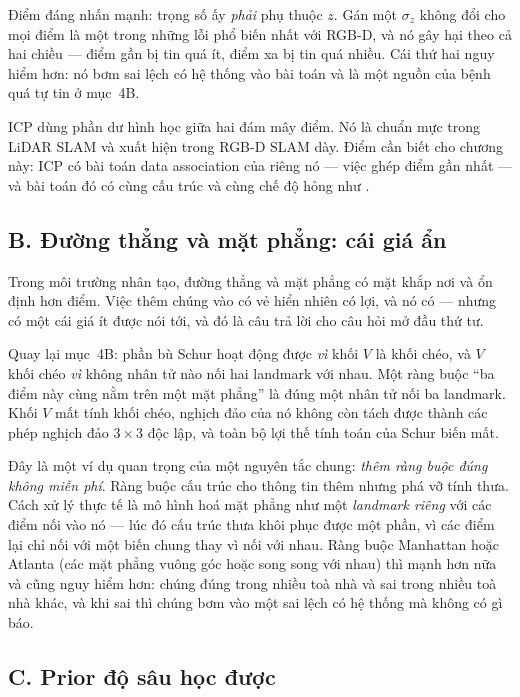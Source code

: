 \documentclass[../../vslam.tex]{subfiles}
\begin{document}
Điểm đáng nhấn mạnh: trọng số ấy \emph{phải} phụ thuộc \(z\). Gán một \(\sigma_z\) không đổi cho mọi điểm là một trong những lỗi phổ biến nhất với RGB-D, và nó gây hại theo cả hai chiều --- điểm gần bị tin quá ít, điểm xa bị tin quá nhiều. Cái thứ hai nguy hiểm hơn: nó bơm sai lệch có hệ thống vào bài toán và là một nguồn của bệnh quá tự tin ở  mục~4B.

ICP dùng phần dư hình học giữa hai đám mây điểm. Nó là chuẩn mực trong LiDAR SLAM và xuất hiện trong RGB-D SLAM dày. Điểm cần biết cho chương này: ICP có bài toán data association của riêng nó --- việc ghép điểm gần nhất --- và bài toán đó có cùng cấu trúc và cùng chế độ hỏng như .

\subsection{B. Đường thẳng và mặt phẳng: cái giá ẩn}

Trong môi trường nhân tạo, đường thẳng và mặt phẳng có mặt khắp nơi và ổn định hơn điểm. Việc thêm chúng vào có vẻ hiển nhiên có lợi, và nó có --- nhưng có một cái giá ít được nói tới, và đó là câu trả lời cho câu hỏi mở đầu thứ tư.

Quay lại  mục~4B: phần bù Schur hoạt động được \emph{vì} khối \(V\) là khối chéo, và \(V\) khối chéo \emph{vì} không nhân tử nào nối hai landmark với nhau. Một ràng buộc ``ba điểm này cùng nằm trên một mặt phẳng'' là đúng một nhân tử nối ba landmark. Khối \(V\) mất tính khối chéo, nghịch đảo của nó không còn tách được thành các phép nghịch đảo \(3\times3\) độc lập, và toàn bộ lợi thế tính toán của Schur biến mất.

Đây là một ví dụ quan trọng của một nguyên tắc chung: \emph{thêm ràng buộc đúng không miễn phí}. Ràng buộc cấu trúc cho thông tin thêm nhưng phá vỡ tính thưa. Cách xử lý thực tế là mô hình hoá mặt phẳng như một \emph{landmark riêng} với các điểm nối vào nó --- lúc đó cấu trúc thưa khôi phục được một phần, vì các điểm lại chỉ nối với một biến chung thay vì nối với nhau. Ràng buộc Manhattan hoặc Atlanta (các mặt phẳng vuông góc hoặc song song với nhau) thì mạnh hơn nữa và cũng nguy hiểm hơn: chúng đúng trong nhiều toà nhà và sai trong nhiều toà nhà khác, và khi sai thì chúng bơm vào một sai lệch có hệ thống mà không có gì báo.

\subsection{C. Prior độ sâu học được}
\end{document}
